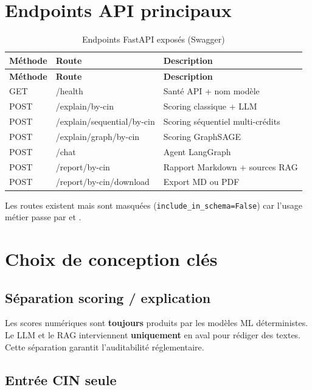 \section{Endpoints API principaux}

\begin{longtable}{|l|l|p{6cm}|}
  \caption{Endpoints FastAPI exposés (Swagger)} \\
  \hline
  \textbf{Méthode} & \textbf{Route} & \textbf{Description} \\
  \hline
  \endfirsthead
  \hline
  \textbf{Méthode} & \textbf{Route} & \textbf{Description} \\
  \hline
  \endhead
  GET & /health & Santé API + nom modèle \\
  \hline
  POST & /explain/by-cin & Scoring classique + LLM \\
  \hline
  POST & /explain/sequential/by-cin & Scoring séquentiel multi-crédits \\
  \hline
  POST & /explain/graph/by-cin & Scoring GraphSAGE \\
  \hline
  POST & /chat & Agent LangGraph \\
  \hline
  POST & /report/by-cin & Rapport Markdown + sources RAG \\
  \hline
  POST & /report/by-cin/download & Export MD ou PDF \\
  \hline
\end{longtable}

Les routes  existent mais sont masquées (\texttt{include\_in\_schema=False}) car l'usage métier passe par  et .

\section{Choix de conception clés}

\subsection{Séparation scoring / explication}

Les scores numériques sont \textbf{toujours} produits par les modèles ML déterministes. Le LLM et le RAG interviennent \textbf{uniquement} en aval pour rédiger des textes. Cette séparation garantit l'auditabilité réglementaire.

\subsection{Entrée CIN seule}

